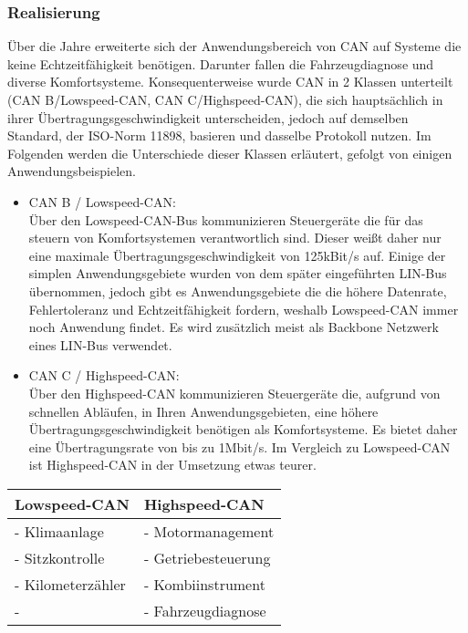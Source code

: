     \subsubsection{Realisierung}
    Über die Jahre erweiterte sich der Anwendungsbereich von CAN auf Systeme
    die keine Echtzeitfähigkeit benötigen. Darunter fallen die Fahrzeugdiagnose und diverse 
    Komfortsysteme. Konsequenterweise wurde CAN in 2 Klassen unterteilt (CAN B/Lowspeed-CAN, 
    CAN C/Highspeed-CAN), die sich hauptsächlich in ihrer Übertragungsgeschwindigkeit 
    unterscheiden, jedoch auf demselben Standard, der ISO-Norm 11898, basieren und dasselbe 
    Protokoll nutzen. Im Folgenden werden die Unterschiede dieser Klassen erläutert, gefolgt von 
    einigen Anwendungsbeispielen.
    \begin{itemize}
        \item{CAN B / Lowspeed-CAN:}\\
        Über den Lowspeed-CAN-Bus kommunizieren Steuergeräte die für das steuern von 
        Komfortsystemen verantwortlich sind. Dieser weißt daher nur eine maximale 
        Übertragungsgeschwindigkeit von 125kBit/s auf. Einige der simplen Anwendungsgebiete wurden
        von dem später eingeführten LIN-Bus übernommen, jedoch gibt es Anwendungsgebiete die 
        die höhere Datenrate, Fehlertoleranz und Echtzeitfähigkeit fordern, weshalb Lowspeed-CAN immer 
        noch Anwendung findet.
        Es wird zusätzlich meist als Backbone Netzwerk eines LIN-Bus verwendet.
        ~\cite{LA_Bosch_6te_auflage}
        \item{CAN C / Highspeed-CAN:}\\
        Über den Highspeed-CAN kommunizieren Steuergeräte die, aufgrund von schnellen Abläufen, in 
        Ihren Anwendungsgebieten, eine höhere Übertragungsgeschwindigkeit benötigen als
        Komfortsysteme. Es bietet daher eine Übertragungsrate von bis zu 1Mbit/s.
        Im Vergleich zu Lowspeed-CAN ist Highspeed-CAN in der Umsetzung etwas teurer.
        ~\cite{LA_Bosch_6te_auflage}
    \end{itemize}
    \begin{center}
    \begin{tabular}{p{5.5cm} p{5.5cm}}
    \hline
    Lowspeed-CAN & Highspeed-CAN\\
    \hline
    \hline - Klimaanlage & - Motormanagement\\
    \hline - Sitzkontrolle & - Getriebesteuerung\\
    \hline - Kilometerzähler & - Kombiinstrument\\
    \hline - & - Fahrzeugdiagnose\\
    \hline
    \end{tabular}            
    \end{center}
